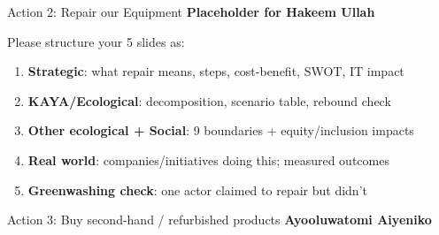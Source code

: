 \documentclass[aspectratio=169]{beamer}
\begin{document}
\begin{frame}{Action 2: Repair our Equipment}
\large
\textbf{Placeholder for Hakeem Ullah}
\vspace{0.5cm}

Please structure your 5 slides as:
\begin{enumerate}
  \item \textbf{Strategic}: what repair means, steps, cost-benefit, SWOT, IT impact
  \item \textbf{KAYA/Ecological}: decomposition, scenario table, rebound check
  \item \textbf{Other ecological + Social}: 9 boundaries + equity/inclusion impacts
  \item \textbf{Real world}: companies/initiatives doing this; measured outcomes
  \item \textbf{Greenwashing check}: one actor claimed to repair but didn't
\end{enumerate}
\end{frame}

\begin{frame}{Action 3: Buy second-hand / refurbished products}
\large
\textbf{Ayooluwatomi Aiyeniko}
\vspace{0.5cm}

\end{frame}

\end{document}
